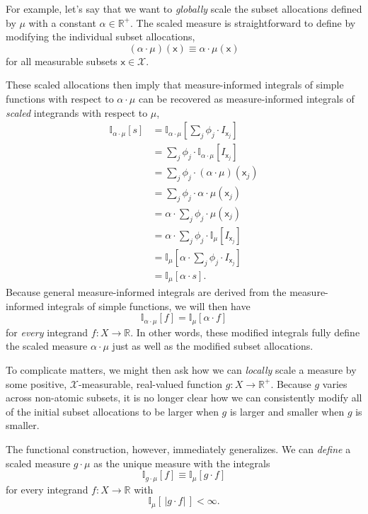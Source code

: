 \documentclass[
  letterpaper,
  DIV=11,
  numbers=noendperiod]{scrartcl}
\begin{document}
For example, let's say that we want to \emph{globally} scale the subset
allocations defined by \(\mu\) with a constant
\(\alpha \in \mathbb{R}^{+}\). The scaled measure is straightforward to
define by modifying the individual subset allocations, \[
(\alpha \cdot \mu)(\mathsf{x}) \equiv \alpha \cdot \mu(\mathsf{x})
\] for all measurable subsets \(\mathsf{x} \in \mathcal{X}\).

These scaled allocations then imply that measure-informed integrals of
simple functions with respect to \(\alpha \cdot \mu\) can be recovered
as measure-informed integrals of \emph{scaled} integrands with respect
to \(\mu\), \begin{align*}
\mathbb{I}_{\alpha \cdot \mu} [ s ]
&=
\mathbb{I}_{\alpha \cdot \mu}
\left[ \sum_{j} \phi_{j} \cdot I_{\mathsf{x}_{j}} \right]
\\
&=
\sum_{j} \phi_{j} \cdot
\mathbb{I}_{\alpha \cdot \mu} [ I_{\mathsf{x}_{j}} ]
\\
&=
\sum_{j} \phi_{j} \cdot (\alpha \cdot \mu)(\mathsf{x}_{j})
\\
&=
\sum_{j} \phi_{j} \cdot \alpha \cdot \mu(\mathsf{x}_{j})
\\
&=
\alpha \cdot \sum_{j} \phi_{j} \cdot \mu(\mathsf{x}_{j})
\\
&=
\alpha \cdot \sum_{j} \phi_{j} \cdot
\mathbb{I}_{\mu}
[ I_{\mathsf{x}_{j}} ]
\\
&=
\mathbb{I}_{\mu}
\left[ \alpha \cdot \sum_{j} \phi_{j} \cdot I_{\mathsf{x}_{j}} \right]
\\
&=
\mathbb{I}_{\mu} [ \alpha \cdot s ].
\end{align*} Because general measure-informed integrals are derived from
the measure-informed integrals of simple functions, we will then have \[
\mathbb{I}_{\alpha \cdot \mu} [ f ]
=
\mathbb{I}_{\mu} [ \alpha \cdot f ]
\] for \emph{every} integrand \(f: X \rightarrow \mathbb{R}\). In other
words, these modified integrals fully define the scaled measure
\(\alpha \cdot \mu\) just as well as the modified subset allocations.

To complicate matters, we might then ask how we can \emph{locally} scale
a measure by some positive, \(\mathcal{X}\)-measurable, real-valued
function \(g: X \rightarrow \mathbb{R}^{+}\). Because \(g\) varies
across non-atomic subsets, it is no longer clear how we can consistently
modify all of the initial subset allocations to be larger when \(g\) is
larger and smaller when \(g\) is smaller.

The functional construction, however, immediately generalizes. We can
\emph{define} a scaled measure \(g \cdot \mu\) as the unique measure
with the integrals \[
\mathbb{I}_{g \cdot \mu} [ f ]
\equiv
\mathbb{I}_{\mu} [ g \cdot f ]
\] for every integrand \(f: X \rightarrow \mathbb{R}\) with \[
\mathbb{I}_{\mu} [ \, | g \cdot f | \, ] < \infty.
\]
\end{document}
